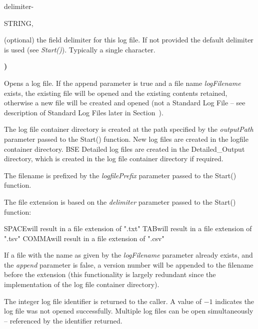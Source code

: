 \begin{minipage}{\dimexpr\textwidth-2em}
        \medskip
        \begin{minipage}[t][][b]{9.5em}delimiter\hfill{-}\end{minipage}
        \begin{minipage}[t][][b]{5.5em}STRING,\hfill\end{minipage}
        \begin{minipage}[t][][b]{\dimexpr\textwidth-15.5em}
            (optional) the field delimiter for this log file. If not provided the default delimiter is used (see \textit{Start()}). Typically a single character.
        \end{minipage}\vfill
\end{minipage}

\textbf{)}

\medskip
Opens a log file. If the append parameter is true and a file name \textit{logFilename} exists, the existing file will be opened and the existing contents retained, otherwise a new file will be created and opened (not a Standard Log File -- see description of Standard Log Files later in Section~).

The log file container directory is created at the path specified by the \textit{outputPath} parameter passed to the Start() function. New log files are created in the logfile container directory. BSE Detailed log files are created in the Detailed\_Output directory, which is created in the log file container directory if required.

The filename is prefixed by the \textit{logfilePrefix} parameter passed to the Start() function.

\newpage
The file extension is based on the \textit{delimiter} parameter passed to the Start() function:

\tabto{3em}SPACE\tabto{7em}will result in a file extension of ".txt"
\tabto{3em}TAB\tabto{7em}will result in a file extension of ".tsv"
\tabto{3em}COMMA\tabto{7em}will result in a file extension of ".csv"  

If a file with the name as given by the \textit{logFilename} parameter already exists, and the \textit{append} parameter is false, a version number will be appended to the filename before the extension (this functionality is largely redundant since the implementation of the log file container directory).  

The integer log file identifier is returned to the caller. A value of $-1$ indicates the log file was not opened successfully.  Multiple log files can be open simultaneously -- referenced by the identifier returned.

